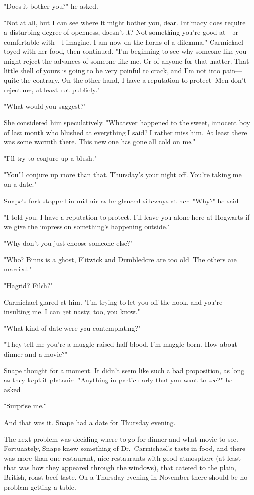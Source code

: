 "Does it bother you?" he asked.

"Not at all, but I can see where it might bother you, dear. Intimacy does require a disturbing degree of{\el} openness, doesn't it? Not something you're good at—or comfortable with—I imagine. I am now on the horns of a dilemma." Carmichael toyed with her food, then continued. "I'm beginning to see why someone like you might reject the advances of someone like me. Or of anyone for that matter. That little shell of yours is going to be very painful to crack, and I'm not into pain—quite the contrary. On the other hand, I have a reputation to protect. Men don't reject me, at least not publicly."

"What would you suggest?"

She considered him speculatively. "Whatever happened to the sweet, innocent boy of last month who blushed at everything I said? I rather miss him. At least there was some warmth there. This new one has gone all cold on me."

"I'll try to conjure up a blush."

"You'll conjure up more than that. Thursday's your night off. You're taking me on a date."

Snape's fork stopped in mid air as he glanced sideways at her. "Why?" he said.

"I told you. I have a reputation to protect. I'll leave you alone here at Hogwarts if we give the impression something's happening outside."

"Why don't you just choose someone else?"

"Who? Binns is a ghost, Flitwick and Dumbledore are too old. The others are married."

"Hagrid? Filch?"

Carmichael glared at him. "I'm trying to let you off the hook, and you're insulting me. I can get nasty, too, you know."

"What kind of date were you contemplating?"

"They tell me you're a muggle-raised half-blood. I'm muggle-born. How about dinner and a movie?"

Snape thought for a moment. It didn't seem like such a bad proposition, as long as they kept it platonic. "Anything in particularly that you want to see?" he asked.

"Surprise me."

And that was it. Snape had a date for Thursday evening.

The next problem was deciding where to go for dinner and what movie to see. Fortunately, Snape knew something of Dr.~Carmichael's taste in food, and there was more than one restaurant, nice restaurants with good atmosphere (at least that was how they appeared through the windows), that catered to the plain, British, roast beef taste. On a Thursday evening in November there should be no problem getting a table.

